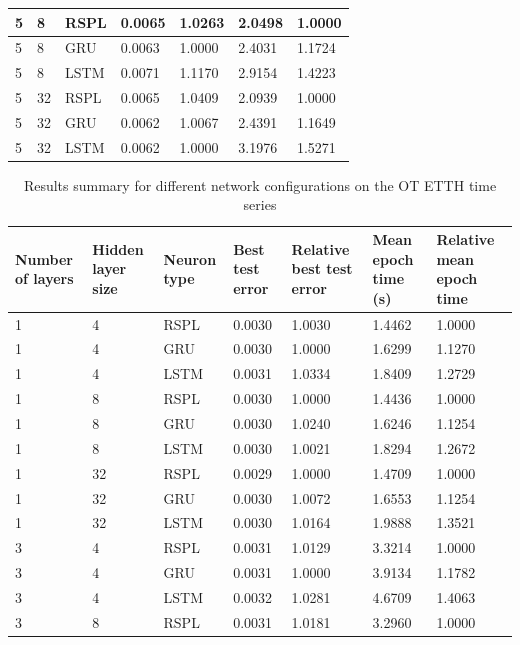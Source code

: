 \documentclass[sn-apa]{sn-jnl}%
\begin{document}
\begin{table}[H]
\begin{tabular}{|p{1.4cm}|p{1.4cm}|p{1.4cm}|p{1.5cm}|p{2.5cm}|p{1.9cm}|p{2cm}|}
\hline
 5 &   8 &   RSPL & 0.0065 & 1.0263 & 2.0498 &  1.0000 \\
\hline
 5 &   8 &   GRU & 0.0063 & 1.0000 & 2.4031 &  1.1724 \\
\hline
 5 &   8 &  LSTM & 0.0071 & 1.1170 & 2.9154 &  1.4223 \\
\hline
 5 &  32 &   RSPL & 0.0065 & 1.0409 & 2.0939 &  1.0000 \\
\hline
 5 &  32 &   GRU & 0.0062 & 1.0067 & 2.4391 &  1.1649 \\
\hline
 5 &  32 &  LSTM & 0.0062 & 1.0000 & 3.1976 &  1.5271 \\
\hline
\end{tabular}
\end{table}

\begin{table}[H]
\caption{Results summary for different network configurations on the OT ETTH time series}\label{table2}
\begin{tabular}{|p{1.4cm}|p{1.4cm}|p{1.4cm}|p{1.5cm}|p{2.5cm}|p{1.9cm}|p{2cm}|}
\hline
Number of layers & Hidden layer size & Neuron type & Best test error & Relative best test error & Mean epoch time (s) & Relative mean epoch time \\
\hline
1 &   4 &   RSPL & 0.0030 & 1.0030 & 1.4462 &  1.0000 \\
\hline
1 &   4 &   GRU & 0.0030 & 1.0000 & 1.6299 &  1.1270 \\
\hline
1 &   4 &  LSTM & 0.0031 & 1.0334 & 1.8409 &  1.2729 \\
\hline
1 &   8 &   RSPL & 0.0030 & 1.0000 & 1.4436 &  1.0000 \\
\hline
1 &   8 &   GRU & 0.0030 & 1.0240 & 1.6246 &  1.1254 \\
\hline
1 &   8 &  LSTM & 0.0030 & 1.0021 & 1.8294 &  1.2672 \\
\hline
1 &  32 &   RSPL & 0.0029 & 1.0000 & 1.4709 &  1.0000 \\
\hline
1 &  32 &   GRU & 0.0030 & 1.0072 & 1.6553 &  1.1254 \\
\hline
1 &  32 &  LSTM & 0.0030 & 1.0164 & 1.9888 &  1.3521 \\
\hline
3 &   4 &   RSPL & 0.0031 & 1.0129 & 3.3214 &  1.0000 \\
\hline
3 &   4 &   GRU & 0.0031 & 1.0000 & 3.9134 &  1.1782 \\
\hline
3 &   4 &  LSTM & 0.0032 & 1.0281 & 4.6709 &  1.4063 \\
\hline
3 &   8 &   RSPL & 0.0031 & 1.0181 & 3.2960 &  1.0000 \\

\end{tabular}
\end{table}
\end{document}
